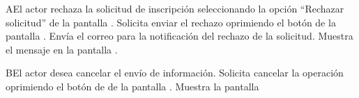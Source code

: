  \begin{UCtrayectoriaA}{A}{El actor rechaza la solicitud de inscripción seleccionando la opción ``Rechazar solicitud'' de la pantalla .}
   \UCpaso[\UCactor] Solicita enviar el rechazo oprimiendo el botón  de la pantalla . 
    \UCpaso[\UCsist] Envía el correo para la notificación del rechazo de la solicitud.
    \UCpaso[\UCsist] Muestra  el mensaje  en la pantalla .
 \end{UCtrayectoriaA}
 
 \begin{UCtrayectoriaA}{B}{El actor desea cancelar el envío de información.}
    \UCpaso[\UCactor] Solicita cancelar la operación oprimiendo el botón de  de la pantalla .
    \UCpaso[\UCsist] Muestra la pantalla 
 \end{UCtrayectoriaA}
